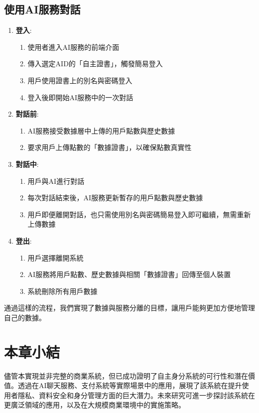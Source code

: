\subsection{使用AI服務對話}
\begin{enumerate}
  \item \textbf{登入}:
        \begin{enumerate}
          \item 使用者進入AI服務的前端介面
          \item 傳入選定AID的「自主證書」，觸發簡易登入
          \item 用戶使用證書上的別名與密碼登入
          \item 登入後即開始AI服務中的一次對話
        \end{enumerate}
  \item \textbf{對話前}:
        \begin{enumerate}
          \item AI服務接受數據層中上傳的用戶點數與歷史數據
          \item 要求用戶上傳點數的「數據證書」，以確保點數真實性
        \end{enumerate}
  \item \textbf{對話中}:
        \begin{enumerate}
          \item 用戶與AI進行對話
          \item 每次對話結束後，AI服務更新暫存的用戶點數與歷史數據
          \item 用戶即便離開對話，也只需使用別名與密碼簡易登入即可繼續，無需重新上傳數據
        \end{enumerate}
  \item \textbf{登出}:
        \begin{enumerate}
          \item 用戶選擇離開系統
          \item AI服務將用戶點數、歷史數據與相關「數據證書」回傳至個人裝置
          \item 系統刪除所有用戶數據
        \end{enumerate}
\end{enumerate}
通過這樣的流程，我們實現了數據與服務分離的目標，讓用戶能夠更加方便地管理自己的數據。
\section{本章小結}
儘管本實現並非完整的商業系統，但已成功證明了自主身分系統的可行性和潛在價值。透過在AI聊天服務、支付系統等實際場景中的應用，展現了該系統在提升使用者隱私、資料安全和身分管理方面的巨大潛力。未來研究可進一步探討該系統在更廣泛領域的應用，以及在大規模商業環境中的實施策略。